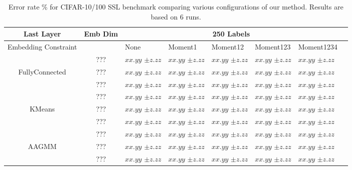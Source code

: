 \documentclass[10pt,twocolumn,letterpaper]{article}
\begin{document}
\begin{table*}[ht!]
\begin{tabularx}{\textwidth}{c|c|XXXXXX}
		\hline\hline
		 Last Layer  &   Emb Dim  & \multicolumn{5}{c}{250 Labels}            \\ \hline
		\multicolumn{1}{c|}{Embedding Constraint} &  & None & Moment1 & Moment12 & Moment123 & Moment1234  \\ \hline
		 & ???   & $xx.yy$ \scriptsize{$\pm z.zz$}   & $xx.yy$ \scriptsize{$\pm z.zz$} & $xx.yy$ \scriptsize{$\pm z.zz$} & $xx.yy$ \scriptsize{$\pm z.zz$} & $xx.yy$ \scriptsize{$\pm z.zz$}  \\
		FullyConnected & ???   & $xx.yy$ \scriptsize{$\pm z.zz$}   & $xx.yy$ \scriptsize{$\pm z.zz$} & $xx.yy$ \scriptsize{$\pm z.zz$} & $xx.yy$ \scriptsize{$\pm z.zz$} & $xx.yy$ \scriptsize{$\pm z.zz$}  \\
		 & ???   & $xx.yy$ \scriptsize{$\pm z.zz$}   & $xx.yy$ \scriptsize{$\pm z.zz$} & $xx.yy$ \scriptsize{$\pm z.zz$} & $xx.yy$ \scriptsize{$\pm z.zz$} & $xx.yy$ \scriptsize{$\pm z.zz$}  \\
		 \hline
		  & ??? & $xx.yy$ \scriptsize{$\pm z.zz$}    & $xx.yy$ \scriptsize{$\pm z.zz$} & $xx.yy$ \scriptsize{$\pm z.zz$} & $xx.yy$ \scriptsize{$\pm z.zz$} & $xx.yy$ \scriptsize{$\pm z.zz$}  \\
		KMeans  & ??? & $xx.yy$ \scriptsize{$\pm z.zz$}    & $xx.yy$ \scriptsize{$\pm z.zz$} & $xx.yy$ \scriptsize{$\pm z.zz$} & $xx.yy$ \scriptsize{$\pm z.zz$} & $xx.yy$ \scriptsize{$\pm z.zz$}  \\
		  & ??? & $xx.yy$ \scriptsize{$\pm z.zz$}    & $xx.yy$ \scriptsize{$\pm z.zz$} & $xx.yy$ \scriptsize{$\pm z.zz$} & $xx.yy$ \scriptsize{$\pm z.zz$} & $xx.yy$ \scriptsize{$\pm z.zz$}  \\
		  \hline
		 & ???   & $xx.yy$ \scriptsize{$\pm z.zz$}    & $xx.yy$ \scriptsize{$\pm z.zz$}& $xx.yy$ \scriptsize{$\pm z.zz$} & $xx.yy$ \scriptsize{$\pm z.zz$} & $xx.yy$ \scriptsize{$\pm z.zz$}  \\
		AAGMM & ???   & $xx.yy$ \scriptsize{$\pm z.zz$}    & $xx.yy$ \scriptsize{$\pm z.zz$}& $xx.yy$ \scriptsize{$\pm z.zz$} & $xx.yy$ \scriptsize{$\pm z.zz$} & $xx.yy$ \scriptsize{$\pm z.zz$}  \\
		 & ???   & $xx.yy$ \scriptsize{$\pm z.zz$}    & $xx.yy$ \scriptsize{$\pm z.zz$}& $xx.yy$ \scriptsize{$\pm z.zz$} & $xx.yy$ \scriptsize{$\pm z.zz$} & $xx.yy$ \scriptsize{$\pm z.zz$}  \\
	\end{tabularx}
	\caption{Error rate \% for CIFAR-10/100 SSL benchmark comparing various configurations of our method. Results are based on 6 runs.}
	\label{table1}
	
\end{table*}
\end{document}
